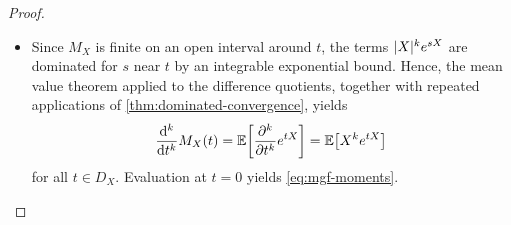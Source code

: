 \begin{proof}
\begin{itemize}
\item[\ref{item:mgf-properties-derivatives}]
Since $M_X$ is finite on an open interval around $t$, the terms $|X|^ke^{sX}$ are dominated for $s$ near $t$ by an integrable exponential bound.
Hence, the mean value theorem applied to the difference quotients, together with repeated applications of \autoref{thm:dominated-convergence}, yields
\[
\frac{\mathrm{d}^k}{\mathrm{d} t^k}M_X(t)
=
\operatorname{\mathbb{E}}\biggl[\frac{\partial^k}{\partial t^k}e^{tX}\biggr]
=
\operatorname{\mathbb{E}}\bigl[X^ke^{tX}\bigr]
\]
for all $t \in D_X$.
Evaluation at $t=0$ yields \eqref{eq:mgf-moments}.




\end{itemize}
\end{proof}

